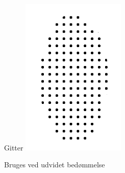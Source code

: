 \documentclass[xcolor=table]{beamer}
\begin{document}
\begin{frame}
\begin{columns}[t]
        \begin{exampleblock}{Gitter}
            \centering
            \includegraphics[width=0.6\textwidth]{billeder/blob_grid}

            Bruges ved udvidet bedømmelse
        \end{exampleblock}
    \end{columns}

\end{frame}
\end{document}
